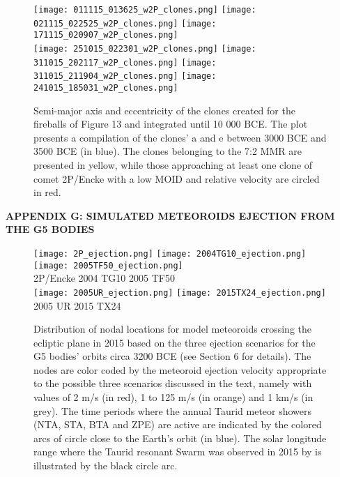 \documentclass[a4paper,11pt]{article}
\begin{document}
\begin{figure*}[!ht]
  \centering
  \texttt{[image: 011115\_013625\_w2P\_clones.png]}
  \texttt{[image: 021115\_022525\_w2P\_clones.png]}
  \texttt{[image: 171115\_020907\_w2P\_clones.png]}\\
  \texttt{[image: 251015\_022301\_w2P\_clones.png]}
  \texttt{[image: 311015\_202117\_w2P\_clones.png]}
  \texttt{[image: 311015\_211904\_w2P\_clones.png]}
  \texttt{[image: 241015\_185031\_w2P\_clones.png]}
  \caption{Semi-major axis and eccentricity of the clones created for the fireballs of Figure 13 and integrated until 10 000 BCE. The plot presents a compilation of the clones' a and e between 3000 BCE and 3500 BCE (in blue). The clones belonging to the 7:2 MMR are presented in yellow, while those approaching at least one clone of comet 2P/Encke with a low MOID and relative velocity are circled in red.}
  \label{fig:clones_selected_fireballs2}
\end{figure*}

\clearpage
\newpage
\textbf{APPENDIX G: SIMULATED METEOROIDS EJECTION FROM THE G5 BODIES}\\ \label{appendix:ejection} 

\begin{figure*}[!ht]
  \centering
  \texttt{[image: 2P\_ejection.png]}
  \texttt{[image: 2004TG10\_ejection.png]}
  \texttt{[image: 2005TF50\_ejection.png]}\\
  \large 2P/Encke \hspace{3.5cm} 2004 TG10 \hspace{3cm} 2005 TF50\\[0.2cm]
  \texttt{[image: 2005UR\_ejection.png]}
  \texttt{[image: 2015TX24\_ejection.png]}\\
  \large 2005 UR \hspace{4cm} 2015 TX24 \hspace{2cm}\\
  \caption{Distribution of nodal locations for model meteoroids crossing the ecliptic plane in 2015 based on the three ejection scenarios for the G5 bodies' orbits circa 3200 BCE (see Section 6 for details). The nodes are color coded by the meteoroid ejection velocity appropriate to the possible three scenarios discussed in the text, namely with values of 2 m/s (in red), 1 to 125 m/s (in orange) and 1 km/s (in grey). The time periods where the annual Taurid meteor showers (NTA, STA, BTA and ZPE) are active are indicated by the colored arcs of circle close to the Earth's orbit (in blue). The solar longitude range where the Taurid resonant Swarm was observed in 2015 by \protect\cite{Spurny2017} is illustrated by the black circle arc.}
  \label{fig:Ejections_3200BCE}
\end{figure*}
\end{document}
